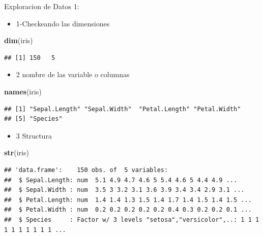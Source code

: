 \documentclass[ignorenonframetext,]{beamer}
\newenvironment{Shaded}{\begin{snugshade}}{\end{snugshade}}
\newcommand{\KeywordTok}[1]{\textcolor[rgb]{0.13,0.29,0.53}{\textbf{#1}}}
\newcommand{\NormalTok}[1]{#1}
\providecommand{\tightlist}{%
  \setlength{\itemsep}{0pt}\setlength{\parskip}{0pt}}
\begin{document}
\begin{frame}[fragile]{Exploracion de Datos 1:}

\begin{itemize}
\tightlist
\item
  1-Checkeando las dimensiones
\end{itemize}

\begin{Shaded}
\begin{Highlighting}[]
\KeywordTok{dim}\NormalTok{(iris)}
\end{Highlighting}
\end{Shaded}

\begin{verbatim}
## [1] 150   5
\end{verbatim}

\begin{itemize}
\tightlist
\item
  2 nombre de las variable o columnas
\end{itemize}

\begin{Shaded}
\begin{Highlighting}[]
\KeywordTok{names}\NormalTok{(iris)}
\end{Highlighting}
\end{Shaded}

\begin{verbatim}
## [1] "Sepal.Length" "Sepal.Width"  "Petal.Length" "Petal.Width" 
## [5] "Species"
\end{verbatim}

\begin{itemize}
\tightlist
\item
  3 Structura
\end{itemize}

\begin{Shaded}
\begin{Highlighting}[]
\KeywordTok{str}\NormalTok{(iris)}
\end{Highlighting}
\end{Shaded}

\begin{verbatim}
## 'data.frame':    150 obs. of  5 variables:
##  $ Sepal.Length: num  5.1 4.9 4.7 4.6 5 5.4 4.6 5 4.4 4.9 ...
##  $ Sepal.Width : num  3.5 3 3.2 3.1 3.6 3.9 3.4 3.4 2.9 3.1 ...
##  $ Petal.Length: num  1.4 1.4 1.3 1.5 1.4 1.7 1.4 1.5 1.4 1.5 ...
##  $ Petal.Width : num  0.2 0.2 0.2 0.2 0.2 0.4 0.3 0.2 0.2 0.1 ...
##  $ Species     : Factor w/ 3 levels "setosa","versicolor",..: 1 1 1 1 1 1 1 1 1 1 ...
\end{verbatim}

\end{frame}
\end{document}
